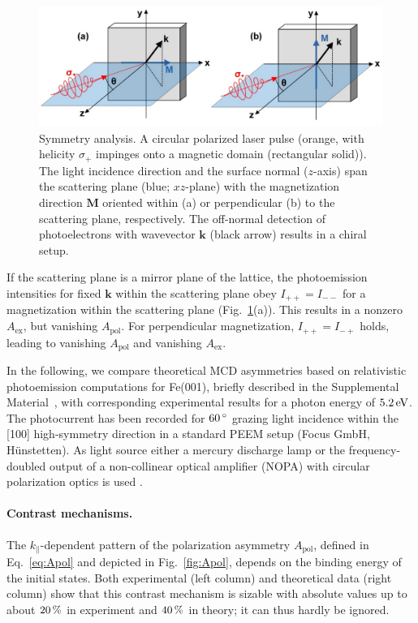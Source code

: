 \documentclass[prl,twocolumn,floatfix,superscriptaddress,aps]{revtex4-2}
\renewcommand{\vec}[1]{\boldsymbol{#1}}
\begin{document}
\begin{figure}
    \centering
    \includegraphics[width = \columnwidth]{symmetry}
    \caption{Symmetry analysis. A circular polarized laser pulse (orange, with helicity $\sigma_{+}$ impinges onto a magnetic domain (rectangular solid)). The light incidence direction and the surface normal ($z$-axis) span the scattering plane (blue; $xz$-plane) with the magnetization direction $\vec{M}$ oriented within (a) or perpendicular (b) to the scattering plane, respectively. The off-normal detection of photoelectrons with wavevector $\vec{k}$ (black arrow) results in a chiral setup.}
    \label{fig:symmetry}
\end{figure}

If the scattering plane is a mirror plane of the lattice, the photoemission intensities for fixed $\vec{k}$ within the scattering plane obey $I_{+ +} = I_{- -}$ for a magnetization within the scattering plane (Fig.~\ref{fig:symmetry}(a)). This results in a nonzero $A_{\mathrm{ex}}$, but vanishing $A_{\mathrm{pol}}$. For perpendicular magnetization, $I_{+ +} = I_{- +}$ holds, leading to vanishing $A_{\mathrm{pol}}$ and vanishing $A_{\mathrm{ex}}$.

In the following, we compare theoretical MCD asymmetries based on relativistic photoemission computations for Fe(001), briefly described in the Supplemental Material~\cite{Supplement}, with corresponding experimental results for a photon energy of $\unit[5.2]{eV}$. The photocurrent has been recorded for $\unit[60]{^{\circ}}$ grazing light incidence within the [100] high-symmetry direction in a standard PEEM setup (Focus GmbH, Hünstetten). As light source either a mercury discharge lamp or the frequency-doubled output of a non-collinear optical amplifier (NOPA) with circular polarization optics is used \cite{duncker2012,gillmeister2020, paleschke2021}. 

\paragraph{Contrast mechanisms.} 
The $k_{\parallel}$-dependent pattern of the polarization asymmetry $A_{\mathrm{pol}}$, defined in Eq.~\eqref{eq:Apol} and depicted in Fig.~\ref{fig:Apol}, depends on the binding energy of the initial states. Both experimental (left column) and theoretical data (right column) show that this contrast mechanism is sizable with absolute values up to about $\unit[20]{\%}$ in experiment and $\unit[40]{\%}$ in theory; it can thus hardly be ignored. 
\end{document}
